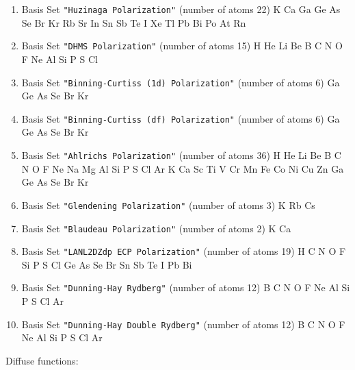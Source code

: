 \begin{enumerate}
\item Basis Set \verb#"Huzinaga Polarization"# (number of atoms 22)  \newline
  K Ca Ga Ge As Se Br Kr Rb Sr In Sn Sb Te I Xe Tl Pb Bi Po At Rn

\item Basis Set \verb#"DHMS Polarization"# (number of atoms 15)  \newline
  H He Li Be B C N O F Ne Al Si P S Cl

\item Basis Set \verb#"Binning-Curtiss (1d) Polarization"# (number of atoms 6)  \newline
  Ga Ge As Se Br Kr


\item Basis Set \verb#"Binning-Curtiss (df) Polarization"# (number of atoms 6)  \newline
  Ga Ge As Se Br Kr


\item Basis Set \verb#"Ahlrichs Polarization"# (number of atoms 36)  \newline
  H He Li Be B C N O F Ne Na Mg Al Si P S Cl Ar K Ca Sc Ti V Cr Mn
 Fe Co Ni Cu Zn Ga Ge As Se Br Kr


\item Basis Set \verb#"Glendening Polarization"# (number of atoms 3)  \newline
  K Rb Cs


\item Basis Set \verb#"Blaudeau Polarization"# (number of atoms 2)  \newline
  K Ca

\item Basis Set \verb#"LANL2DZdp ECP Polarization"# (number of atoms 19)  \newline
  H C N O F Si P S Cl Ge As Se Br Sn Sb Te I Pb Bi

\item Basis Set \verb#"Dunning-Hay Rydberg"# (number of atoms 12)  \newline
  B C N O F Ne Al Si P S Cl Ar


\item Basis Set \verb#"Dunning-Hay Double Rydberg"# (number of atoms 12)  \newline
  B C N O F Ne Al Si P S Cl Ar

\end{enumerate}

Diffuse functions:

